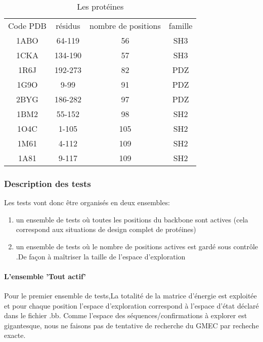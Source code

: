     \begin{table}[!htbp]
      \centering

      \begin{tabular}{cccc}

        \toprule
        Code PDB & résidus & nombre de positions & famille\\
        \cmidrule{1-4}
        1ABO & 	64-119	 & 	56	 & SH3 \\
        1CKA & 	134-190	 & 	57	 & SH3 \\
        1R6J & 	192-273	 & 	82	 & PDZ \\
        1G9O & 	9-99	 & 	91	 & PDZ \\
        2BYG & 	186-282	 & 	97	 & PDZ \\
        1BM2 & 	55-152	 & 	98	 & SH2 \\
        1O4C & 	1-105	 & 	105	 & SH2 \\
        1M61 & 	4-112	 & 	109	 & SH2 \\
        1A81 & 	9-117	 & 	109	 & SH2 \\
        \bottomrule

      \end{tabular}      
      \caption{Les protéines}
\label{tab:protéines}      
    \end{table}

\subsubsection{Description des tests}


Les tests vont donc être organisés en deux ensembles:
\begin{enumerate}
\item un ensemble de tests où toutes les positions du backbone sont actives (cela correspond aux situations de design complet de protéines) 
\item un ensemble de tests où le nombre de positions actives est gardé sous contrôle .De façon à maîtriser la taille de l'espace d'exploration
\end{enumerate}


\paragraph{L'ensemble 'Tout actif'}

Pour le premier ensemble de tests,La totalité de la matrice d'énergie est exploitée et pour chaque position l'espace d'exploration correspond à l'espace d'état déclaré dans le fichier .bb.
Comme l'espace des séquences/confirmations à explorer est gigantesque, nous ne faisons pas de tentative de recherche du GMEC  par recheche exacte. 

